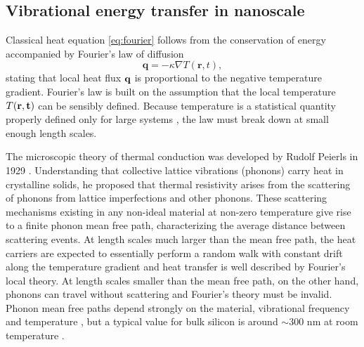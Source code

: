 




\subsection{Vibrational energy transfer in nanoscale}
\label{sec:intro_vib}
Classical heat equation \eqref{eq:fourier} follows from the conservation of energy accompanied by Fourier's law of diffusion \cite{fourier}
\begin{equation}
 \mathbf{q} = -\kappa \nabla T(\mathbf{r},t),
\end{equation}
stating that local heat flux $\mathbf{q}$ is proportional to the negative temperature gradient. Fourier's law is built on the assumption that the local temperature $T(\bf{r},t)$ can be sensibly defined. Because temperature is a statistical quantity properly defined only for large systems \cite{}, the law must break down at small enough length scales. 

The microscopic theory of thermal conduction was developed by Rudolf Peierls in 1929 \cite{peierls29}. Understanding that collective lattice vibrations (phonons) carry heat in crystalline solids, he proposed that thermal resistivity arises from the scattering of phonons from lattice imperfections and other phonons. These scattering mechanisms existing in any non-ideal material at non-zero temperature give rise to a finite phonon mean free path, characterizing the average distance between scattering events. At length scales much larger than the mean free path, the heat carriers are expected to essentially perform a random walk with constant drift along the temperature gradient and heat transfer is well described by Fourier's local theory. At length scales smaller than the mean free path, on the other hand, phonons can travel without scattering and Fourier's theory must be invalid. Phonon mean free paths depend strongly on the material, vibrational frequency and temperature \cite{}, but a typical value for bulk silicon is around $\sim 300$ nm at room temperature \cite{ju99}. 

